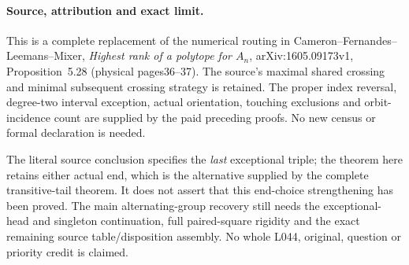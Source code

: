 \documentclass[11pt,a4paper]{article}
\begin{document}
\paragraph{Source, attribution and exact limit.}
This is a complete replacement of the numerical routing in
Cameron--Fernandes--Leemans--Mixer, \emph{Highest rank of a polytope
for $A_n$}, arXiv:1605.09173v1, Proposition~5.28 (physical pages36--37).
The source's maximal shared crossing and minimal subsequent crossing
strategy is retained. The proper index reversal, degree-two interval
exception, actual orientation, touching exclusions and orbit-incidence
count are supplied by the paid preceding proofs. No new census or
formal declaration is needed.

The literal source conclusion specifies the \emph{last} exceptional
triple; the theorem here retains either actual end, which is the
alternative supplied by the complete transitive-tail theorem.
It does not assert that this end-choice strengthening has been proved.
The main alternating-group recovery still needs the exceptional-head
and singleton continuation, full paired-square rigidity and the exact
remaining source table/disposition assembly. No whole L044, original,
question or priority credit is claimed.
\end{document}

